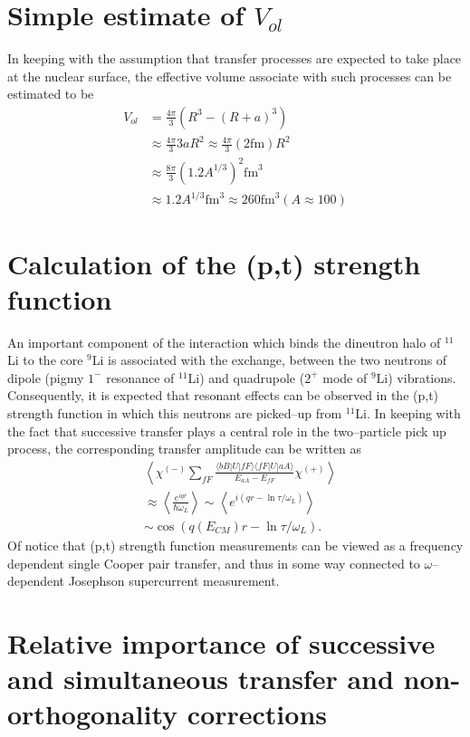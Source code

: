 \documentclass[a4paper,14pt]{article}
\begin{document}
\section{Simple estimate of $V_{ol}$}
In keeping with the assumption that transfer processes are expected to take place at the nuclear surface, the effective volume associate with such processes can be estimated to be
\begin{equation}\label{eq_est_44}
\begin{split}
V_{ol}&=\frac{4\pi}{3}(R^3-(R+a)^3)\\
&\approx \frac{4\pi}{3}3aR^2\approx \frac{4\pi}{3}(2\text{fm})R^2\\
&\approx \frac{8\pi}{3}(1.2A^{1/3})^2\text{fm}^3\\
&\approx 1.2 A^{1/3}\text{fm}^3\approx 260 \text{fm}^3 (A\approx 100)
\end{split}
\end{equation}
\section{Calculation of the (p,t) strength function}
An important component of the interaction which binds the dineutron halo of $^{11}$Li to the core $^9$Li is associated with the exchange, between the two neutrons of dipole (pigmy $1^-$ resonance of $^{11}$Li) and quadrupole ($2^+$ mode of $^9$Li) vibrations. Consequently, it is expected that resonant effects can be observed in the (p,t) strength function in which this neutrons are picked--up from $^{11}$Li. In keeping with the fact that successive transfer plays a central role in the two--particle pick up process, the corresponding transfer amplitude can be written as
\begin{equation}\label{eq_est_45}
\begin{split}
&\left\langle \chi^{(-)}\sum_{fF}\frac{\langle bB|U|fF\rangle\langle fF|U|aA\rangle}{E_{aA}-E_{fF}}\chi^{(+)}\right\rangle\\
&\approx \left\langle \frac{e^{iqr}}{\hbar \omega_L}\right\rangle\sim \left\langle e^{i(qr-\ln \tau/\omega_L )}\right\rangle\\
&\sim \cos\left(q(E_{CM})r-\ln \tau/\omega_L\right).
\end{split}
\end{equation}
Of notice that (p,t) strength function measurements can be viewed as a frequency dependent single Cooper pair transfer, and thus in some way connected to $\omega$--dependent Josephson supercurrent measurement.
\section{Relative importance of successive and simultaneous transfer and non-orthogonality corrections}
\end{document}
